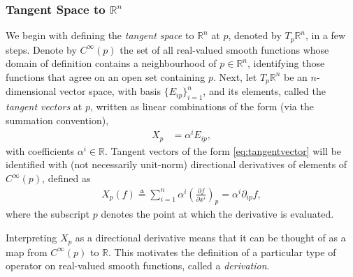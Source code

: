 \documentclass[psamsfonts]{amsart}
\theoremstyle{definition}
\theoremstyle{remark}
\newcommand*\R{\mathds{R}}
\numberwithin{equation}{section}
\begin{document}
\subsubsection{Tangent Space to $\R^n$}
We begin with defining the \textit{tangent space} to $\R^n$ at $p$, denoted by $T_p\R^n$, in a few steps. Denote by $C^{\infty}(p)$ the set of all real-valued smooth functions whose domain of definition contains a neighbourhood of $p\in \R^n$, {identifying} those functions that agree on an open set containing $p$. Next, let $T_p\R^n$ be an $n$-dimensional vector space, with basis $\{E_{ip}\}_{i=1}^{n}$, and its elements, called the \textit{tangent vectors} at $p$, written as linear combinations of the form (via the summation convention),
\begin{align}\label{eq:tangentvector}
X_p &={} \alpha^i E_{ip},
\end{align}
with coefficients $\alpha^i \in \R$. Tangent vectors of the form \ref{eq:tangentvector} will be identified with (not necessarily unit-norm) directional derivatives of elements of $C^{\infty}(p)$, defined as
\begin{equation}
\begin{aligned}
X_p(f) \triangleq \sum_{i = 1}^n \alpha^i \left(\frac{\partial f}{\partial x^i}\right)_p = \alpha^i \partial_{ip} f,
\end{aligned}
\end{equation}
where the subscript $p$ denotes the point at which the derivative is evaluated. 

Interpreting $X_p$ as a directional derivative means that it can be thought of as a map from $C^{\infty}(p)$ to $\R$. This motivates the definition of a particular type of operator on real-valued smooth functions, called a \textit{derivation}. 
\end{document}
